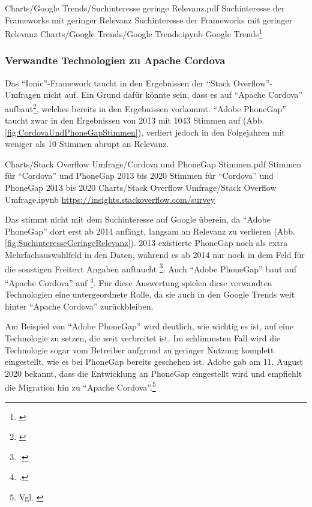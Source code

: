 \begin{alexfigurewithnotebook}{Charts/Google Trends/Suchinteresse geringe Relevanz.pdf}
	{Suchinteresse der Frameworks mit geringer Relevanz}
	{Suchinteresse der Frameworks mit geringer Relevanz}
	{Charts/Google Trends/Google Trends.ipynb}
	{Google Trends\footnote{\cite{FaqPhoneGapDocs}}}
	\label{fig:SuchinteresseGeringeRelevanz}

\end{alexfigurewithnotebook}

\subsubsection{Verwandte Technologien zu Apache Cordova} Das \enquote{Ionic}-Framework taucht in den Ergebnissen der \enquote{Stack Overflow}-Umfragen nicht auf.
Ein Grund dafür könnte sein, dass es auf \enquote{Apache Cordova} aufbaut\footnote{\cite{TheLastWordOnCordovaAndPhoneGap}}, welches bereits in den Ergebnissen vorkommt.
\enquote{Adobe PhoneGap} taucht zwar in den Ergebnissen von 2013 mit 1043 Stimmen auf (Abb. \ref{fig:CordovaUndPhoneGapStimmen}),
verliert jedoch in den Folgejahren mit weniger als 10 Stimmen abrupt an Relevanz.
\begin{alexfigurewithnotebook}{Charts/Stack Overflow Umfrage/Cordova und PhoneGap Stimmen.pdf}
	{Stimmen für \enquote{Cordova} und PhoneGap 2013 bis 2020}
	{Stimmen für \enquote{Cordova} und PhoneGap 2013 bis 2020}
	{Charts/Stack Overflow Umfrage/Stack Overflow Umfrage.ipynb}
	{\url{https://insights.stackoverflow.com/survey}}
	\label{fig:CordovaUndPhoneGapStimmen}

\end{alexfigurewithnotebook}

Das stimmt nicht mit dem Suchinteresse auf Google überein, da \enquote{Adobe PhoneGap} dort erst ab 2014 anfängt,
langsam an Relevanz zu verlieren (Abb. \ref{fig:SuchinteresseGeringeRelevanz}).
2013 existierte PhoneGap noch als extra Mehrfachauswahlfeld in den Daten, während es ab 2014 nur noch in dem Feld für die sonstigen Freitext Angaben auftaucht \footcite[Vgl.][]{StackOverflowInsights}.
Auch \enquote{Adobe PhoneGap} baut auf \enquote{Apache Cordova} auf \footcite[Vgl.][]{FaqPhoneGapDocs}.
Für diese Auswertung spielen diese verwandten Technologien eine untergeordnete Rolle, da sie auch in den Google Trends weit hinter \enquote{Apache Cordova} zurückbleiben.

Am Beispiel von \enquote{Adobe PhoneGap} wird deutlich, wie wichtig es ist, auf eine Technologie zu setzen, die weit verbreitet ist.
Im schlimmsten Fall wird die Technologie sogar vom Betreiber aufgrund zu geringer Nutzung komplett eingestellt, wie es bei PhoneGap bereits geschehen ist.
Adobe gab am 11.
August 2020 bekannt, dass die  Entwicklung an PhoneGap eingestellt wird und empfiehlt die Migration hin zu \enquote{Apache Cordova}.\footnote{Vgl. \cite{UpdateForCustomersUsingPhoneGapAndPhoneGapBuild}}

